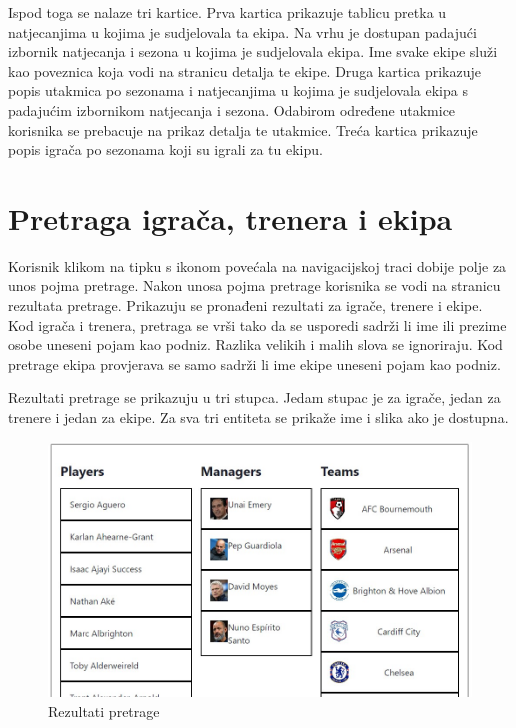 \documentclass[times, utf8, zavrsni]{fer}
\begin{document}
Ispod toga se nalaze tri kartice. Prva kartica prikazuje tablicu pretka u natjecanjima u kojima je sudjelovala ta ekipa. Na vrhu je dostupan padajući izbornik natjecanja i sezona u kojima je sudjelovala ekipa.
Ime svake ekipe služi kao poveznica koja vodi na stranicu detalja te ekipe.
Druga kartica prikazuje popis utakmica po sezonama i natjecanjima u kojima je sudjelovala ekipa s padajućim izbornikom natjecanja i sezona. Odabirom određene utakmice korisnika se prebacuje na prikaz detalja te utakmice.
Treća kartica prikazuje popis igrača po sezonama koji su igrali za tu ekipu.

\section{Pretraga igrača, trenera i ekipa}

Korisnik klikom na tipku s ikonom povećala na navigacijskoj traci dobije polje za unos pojma pretrage. Nakon unosa pojma pretrage korisnika se vodi na stranicu rezultata pretrage.
Prikazuju se pronađeni rezultati za igrače, trenere i ekipe. Kod igrača i trenera, pretraga se vrši tako da se usporedi sadrži li ime ili prezime osobe uneseni pojam kao podniz.
Razlika velikih i malih slova se ignoriraju. Kod pretrage ekipa provjerava se samo sadrži li ime ekipe uneseni pojam kao podniz.

Rezultati pretrage se prikazuju u tri stupca. Jedam stupac je za igrače, jedan za trenere i jedan za ekipe. Za sva tri entiteta se prikaže ime i slika ako je dostupna.

\begin{figure}[htb]
\centering
\includegraphics[width=14cm]{images/search.jpg}
\caption{Rezultati pretrage}
\label{fig:search}
\end{figure}
\end{document}
